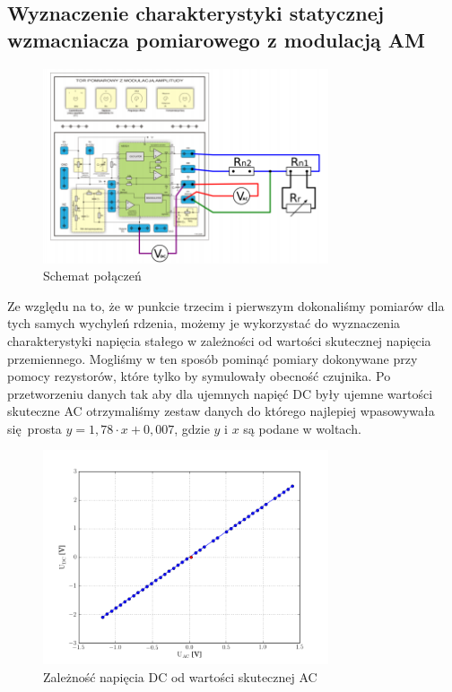 \documentclass[a4paper, 12pt, titlepage]{article}
\begin{document}
		\subsection{Wyznaczenie charakterystyki statycznej wzmacniacza pomiarowego z modulacją AM}
			\begin{figure}[H]
				\centering
				\includegraphics[width=0.75\textwidth]{./img/tor_drugie.png}
				\caption{\small{Schemat połączeń}}
			\end{figure} \noindent
			Ze względu na to, że w punkcie trzecim i pierwszym dokonaliśmy pomiarów dla tych samych wychyleń rdzenia, możemy je wykorzystać do wyznaczenia charakterystyki napięcia stałego w zależności od wartości skutecznej napięcia przemiennego. Mogliśmy w ten sposób pominąć pomiary dokonywane przy pomocy rezystorów, które tylko by symulowały obecność czujnika. Po przetworzeniu danych tak aby dla ujemnych napięć DC były ujemne wartości skuteczne AC otrzymaliśmy zestaw danych do którego najlepiej wpasowywała się prosta $y = 1,78 \cdot x + 0,007$, gdzie $y$ i $x$ są podane w woltach.
			\begin{figure}[H]
				\centering
				\includegraphics[width=0.75\textwidth]{./img/Uac_od_Udc.png}
				\caption{\small{Zależność napięcia DC od wartości skutecznej AC}}
			\end{figure} \noindent
\end{document}
